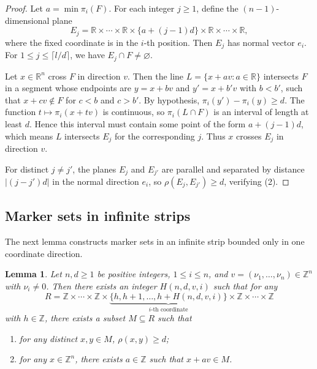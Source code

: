 \documentclass[10pt,a4paper]{amsart}
\newtheorem{lemma}[theorem]{Lemma}
\begin{document}
\begin{proof}
Let $a=\min\pi_i(F)$. For each integer $j\geq 1$, define the
$(n-1)$-dimensional plane
\[
E_j=\mathbb{R}\times\cdots\times\mathbb{R}\times\{a+(j-1)d\}
\times\mathbb{R}\times\cdots\times\mathbb{R},
\]
where the fixed coordinate is in the $i$-th position. Then $E_j$ has normal
vector $e_i$. For $1\leq j\leq \lceil l/d\rceil$, we have
$E_j\cap F\neq\varnothing$.

Let $x\in\mathbb{R}^n$ cross $F$ in direction $v$. Then the line
$L=\{x+av\colon a\in\mathbb{R}\}$ intersects $F$ in a segment whose
endpoints are $y=x+bv$ and $y'=x+b'v$ with $b<b'$, such that
$x+cv\notin F$ for $c<b$ and $c>b'$. By hypothesis,
$\pi_i(y')-\pi_i(y)\geq d$. The function $t\mapsto \pi_i(x+tv)$ is
continuous, so $\pi_i(L\cap F)$ is an interval of length at least $d$.
Hence this interval must contain some point of the form $a+(j-1)d$,
which means $L$ intersects $E_j$ for the corresponding $j$. Thus $x$
crosses $E_j$ in direction $v$.

For distinct $j\neq j'$, the planes $E_j$ and $E_{j'}$ are parallel and
separated by distance $|(j-j')d|$ in the normal direction $e_i$,
so $\rho(E_j, E_{j'})\geq d$, verifying (2).
\end{proof}

\subsection{Marker sets in infinite strips}

The next lemma constructs marker sets in an infinite strip bounded only in
one coordinate direction.

\begin{lemma}\label{lem:generalH}
Let $n, d\geq 1$ be positive integers, $1\leq i\leq n$, and
$v=(\nu_1,\dots, \nu_n)\in\mathbb{Z}^n$ with $\nu_i\neq 0$.
Then there exists an integer $H(n, d, v, i)$ such that for any
\[
R=\mathbb{Z}\times\cdots\times\mathbb{Z}\times
\underbrace{\{h, h+1, \dots, h+H(n, d, v, i)\}}_{\text{$i$-th coordinate}}
\times\mathbb{Z}\times\cdots\times\mathbb{Z}
\]
with $h\in\mathbb{Z}$, there exists a subset $M\subseteq R$ such that
\begin{enumerate}
\item[(1)] for any distinct $x,y\in M$, $\rho(x,y)\geq d$;
\item[(2)] for any $x\in \mathbb{Z}^n$, there exists $a\in\mathbb{Z}$
such that $x+av\in M$.
\end{enumerate}
\end{lemma}
\end{document}
